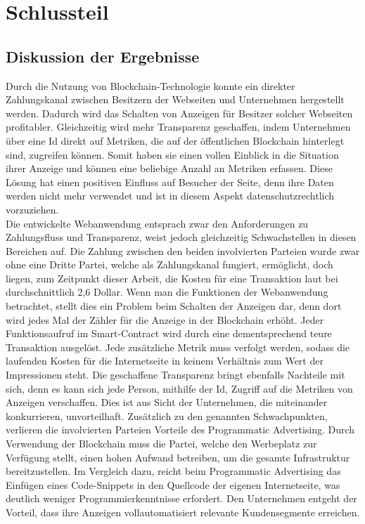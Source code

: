 \chapter{Schlussteil}
\section{Diskussion der Ergebnisse}
Durch die Nutzung von Blockchain-Technologie konnte ein direkter Zahlungskanal zwischen Besitzern der Webseiten und Unternehmen hergestellt werden. Dadurch wird das Schalten von Anzeigen für Besitzer solcher Webseiten profitabler. Gleichzeitig wird mehr Transparenz geschaffen, indem Unternehmen über eine Id direkt auf Metriken, die auf der öffentlichen Blockchain hinterlegt sind, zugreifen können. Somit haben sie einen vollen Einblick in die Situation ihrer Anzeige und können eine beliebige Anzahl an Metriken erfassen. Diese Lösung hat einen positiven Einfluss auf Besucher der Seite, denn ihre Daten werden nicht mehr verwendet und ist in diesem Aspekt datenschutzrechtlich vorzuziehen.\\

Die entwickelte Webanwendung entsprach zwar den Anforderungen zu Zahlungsfluss und Transparenz, weist jedoch gleichzeitig Schwachstellen in diesen Bereichen auf. Die Zahlung zwischen den beiden involvierten Parteien wurde zwar ohne eine Dritte Partei, welche als Zahlungskanal fungiert, ermöglicht, doch liegen, zum Zeitpunkt dieser Arbeit, die Kosten für eine Transaktion laut \cite{etherscan_2021} bei durchschnittlich 2,6 Dollar. Wenn man die Funktionen der Webanwendung betrachtet, stellt dies ein Problem beim Schalten der Anzeigen dar, denn dort wird jedes Mal der Zähler für die Anzeige in der Blockchain erhöht. Jeder Funktionsaufruf im Smart-Contract wird durch eine dementsprechend teure Transaktion ausgelöst. Jede zusätzliche Metrik muss verfolgt werden, sodass die laufenden Kosten für die Internetseite in keinem Verhältnis zum Wert der Impressionen steht.
Die geschaffene Transparenz bringt ebenfalls Nachteile mit sich, denn es kann sich jede Person, mithilfe der Id, Zugriff auf die Metriken von Anzeigen verschaffen. Dies ist aus Sicht der Unternehmen, die miteinander konkurrieren, unvorteilhaft. Zusätzlich zu den genannten Schwachpunkten, verlieren die involvierten Parteien Vorteile des Programmatic Advertising. Durch Verwendung der Blockchain muss die Partei, welche den Werbeplatz zur Verfügung stellt, einen hohen Aufwand betreiben, um die gesamte Infrastruktur bereitzustellen. Im Vergleich dazu, reicht beim Programmatic Advertising das Einfügen eines Code-Snippets in den Quellcode der eigenen Internetseite, was deutlich weniger Programmierkenntnisse erfordert. Den Unternehmen entgeht der Vorteil, dass ihre Anzeigen vollautomatisiert relevante Kundensegmente erreichen.\\

